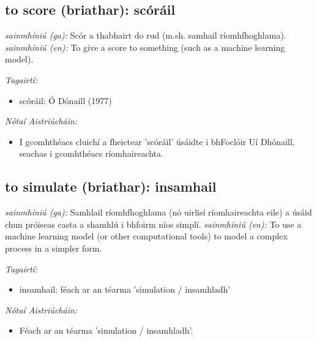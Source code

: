 \documentclass{article}
\begin{document}
\subsection*{to score (briathar): scóráil} 
 \noindent \textit{sainmhíniú (ga):} Scór a thabhairt do rud (m.sh. samhail ríomhfhoghlama).
\newline\newline
 \noindent \textit{sainmhíniú (en):} To give a score to something (such as a machine learning model).
\newline

 \noindent \textit{Tagairtí:}
\begin{itemize}
	\item scóráil: Ó Dónaill (1977) \cite{odonaill}
\end{itemize}

 \noindent \textit{Nótaí Aistriúcháin:}
\begin{itemize}
	\item I gcomhthéacs cluichí a fheictear 'scóráil' úsáidte i bhFoclóir Uí Dhónaill, seachas i gcomhthéacs ríomhaireachta.
\end{itemize}


\subsection*{to simulate (briathar): insamhail} 
 \noindent \textit{sainmhíniú (ga):} Samhlail ríomhfhoghlama (nó uirlisí ríomhaireachta eile) a úsáid chun próiseas casta a shamhlú i bhfoirm níos simplí.
\newline\newline
 \noindent \textit{sainmhíniú (en):} To use a machine learning model (or other computational tools) to model a complex process in a simpler form.
\newline

 \noindent \textit{Tagairtí:}
\begin{itemize}
	\item insamhail: féach ar an téarma 'simulation / insamhladh'
\end{itemize}

 \noindent \textit{Nótaí Aistriúcháin:}
\begin{itemize}
	\item Féach ar an téarma 'simulation / insamhladh'.
\end{itemize}
\end{document}
